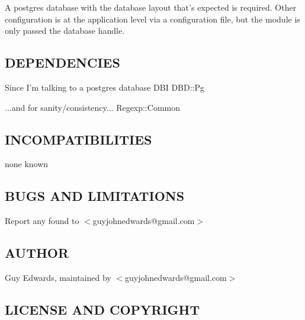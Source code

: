 \documentclass{book}
\begin{document}
A postgres database with the database layout that's expected is required. Other configuration is at the application level via a configuration file, but the module is only passed the database handle.


\subsection{DEPENDENCIES}
\label{Inventory::Hosts_DEPENDENCIES}
\hypertarget{Inventory::Hosts_DEPENDENCIES}{}



Since I'm talking to a postgres database DBI DBD::Pg



...and for sanity/consistency... Regexp::Common


\subsection{INCOMPATIBILITIES}
\label{Inventory::Hosts_INCOMPATIBILITIES}
\hypertarget{Inventory::Hosts_INCOMPATIBILITIES}{}



none known


\subsection{BUGS AND LIMITATIONS}
\label{Inventory::Hosts_BUGS_AND_LIMITATIONS}
\hypertarget{Inventory::Hosts_BUGS_AND_LIMITATIONS}{}



Report any found to $<$guyjohnedwards@gmail.com$>$


\subsection{AUTHOR}
\label{Inventory::Hosts_AUTHOR}
\hypertarget{Inventory::Hosts_AUTHOR}{}



Guy Edwards, maintained by $<$guyjohnedwards@gmail.com$>$


\subsection{LICENSE AND COPYRIGHT}
\label{Inventory::Hosts_LICENSE_AND_COPYRIGHT}
\hypertarget{Inventory::Hosts_LICENSE_AND_COPYRIGHT}{}
\end{document}

